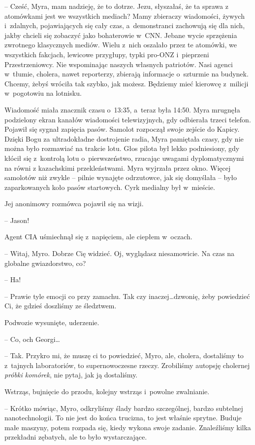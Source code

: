 \documentclass[oneside,polish,11pt,sfheadings]{mwbk}
\begin{document}
-- Cześć, Myra, mam nadzieję, że to dotrze. Jezu, słyszałaś, że ta sprawa
z atomówkami jest we wszystkich mediach? Mamy zbieraczy wiadomości,
żywych i~zdalnych, pojawiających się cały czas, a~demonstranci zachowują
się dla nich, jakby chcieli się zobaczyć jako bohaterowie w~CNN. Jebane
wycie sprzężenia zwrotnego klasycznych mediów. Wielu z~nich oszalało
przez te atomówki, we wszystkich fakcjach, lewicowe przygłupy, typki
pro-ONZ i~pieprzeni Przestrzeniowcy. Nie wspominając naszych własnych
patriotów. Nasi agenci w~tłumie, cholera, nawet reporterzy, zbierają
informacje o~szturmie na budynek. Chcemy, żebyś wróciła tak szybko, jak
możesz. Będziemy mieć kierowcę z~milicji w~pogotowiu na lotnisku.

Wiadomość miała znacznik czasu o~13:35, a~teraz była 14:50. Myra
mrugnęła podzielony ekran kanałów wiadomości telewizyjnych, gdy
odbierała trzeci telefon. Pojawił się sygnał zapięcia pasów. Samolot
rozpoczął swoje zejście do Kapicy. Dzięki Bogu za ultradokładne
dostrojenie radia, Myra pamiętała czasy, gdy nie można było rozmawiać na
trakcie lotu. Głos pilota był lekko podniesiony, gdy kłócił się z~kontrolą lotu o~pierwszeństwo, rzucając uwagami dyplomatycznymi na równi
z kazachskimi przekleństwami. Myra wyjrzała przez okno. Więcej samolotów
niż zwykle -- pilnie wynajęte odrzutowce, jak się domyślała -- było
zaparkowanych koło pasów startowych. Cyrk medialny był w~mieście.

Jej anonimowy rozmówca pojawił się na wizji.

-- Jason!

Agent CIA uśmiechnął się z~napięciem, ale ciepłem w~oczach. 

-- Witaj,
Myro. Dobrze Cię widzieć. Oj, wyglądasz niesamowicie. Na czas na
globalne gwiazdorstwo, co?

-- Ha!

-- Prawie tyle emocji co przy zamachu. Tak czy inaczej\ldots dzwonię, żeby
powiedzieć Ci, że gdzieś doszliśmy ze śledztwem.

Podwozie wysunięte, uderzenie.

-- Co, och Georgi\ldots

-- Tak. Przykro mi, że muszę ci to powiedzieć, Myro, ale, cholera,
dostaliśmy to z~tajnych laboratoriów, to supernowoczesne rzeczy.
Zrobiliśmy autopsję cholernej \textit{próbki komórek}, nie pytaj, jak ją
dostaliśmy.

Wstrząs, bujnięcie do przodu, kolejny wstrząs i~powolne zwalnianie.

-- Krótko mówiąc, Myro, odkryliśmy ślady bardzo szczególnej, bardzo
subtelnej nanotechnologii. To nie jest do końca trucizna, to jest
właśnie sprytne. Buduje małe maszyny, potem rozpada się, kiedy wykona
swoje zadanie. Znaleźliśmy kilka przekładni zębatych, ale to było
wystarczające.
\end{document}

